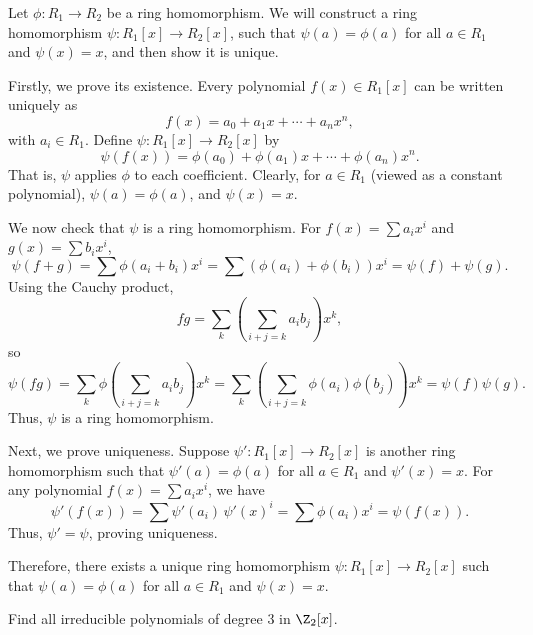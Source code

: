 \begin{solution}
  Let $\phi : R_1 \to R_2$ be a ring homomorphism. We will construct a ring homomorphism $\psi : R_1[x] \to R_2[x]$, such that $\psi(a) = \phi(a)$ for all $a \in R_1$ and $\psi(x) = x$, and then show it is unique.

  Firstly, we prove its existence. Every polynomial $f(x) \in R_1[x]$ can be written uniquely as
  \[%
    f(x) = a_0 + a_1 x + \cdots + a_n x^n
  ,\]%
  with $a_i \in R_1$. Define $\psi : R_1[x] \to R_2[x]$ by
  \[%
    \psi(f(x)) = \phi(a_0) + \phi(a_1)x + \cdots + \phi(a_n)x^n
  .\]%
  That is, $\psi$ applies $\phi$ to each coefficient. Clearly, for $a \in R_1$ (viewed as a constant polynomial), $\psi(a) = \phi(a)$, and $\psi(x) = x$.

  We now check that $\psi$ is a ring homomorphism. For $f(x) = \sum a_i x^i$ and $g(x) = \sum b_i x^i$,
  \[%
    \psi(f + g) = \sum \phi(a_i + b_i)x^i = \sum (\phi(a_i) + \phi(b_i))x^i = \psi(f) + \psi(g)
  .\]%
  Using the Cauchy product,
  \[%
    fg = \sum_{k} \left( \sum_{i+j=k} a_i b_j \right) x^k
  ,\]%
  so
  \[%
    \psi(fg) = \sum_{k} \phi\!\left(\sum_{i+j=k} a_i b_j\right)x^k = \sum_{k} \left(\sum_{i+j=k} \phi(a_i)\phi(b_j)\right)x^k = \psi(f)\psi(g)
  .\]%
  Thus, $\psi$ is a ring homomorphism.

  Next, we prove uniqueness. Suppose $\psi' : R_1[x] \to R_2[x]$ is another ring homomorphism such that $\psi'(a) = \phi(a)$ for all $a \in R_1$ and $\psi'(x) = x$. For any polynomial $f(x) = \sum a_i x^i$, we have
  \[%
    \psi'(f(x)) = \sum \psi'(a_i)\,\psi'(x)^i = \sum \phi(a_i)x^i = \psi(f(x))
  .\]%
  Thus, $\psi' = \psi$, proving uniqueness.

  Therefore, there exists a unique ring homomorphism $\psi : R_1[x] \to R_2[x]$ such that $\psi(a) = \phi(a)$ for all $a \in R_1$ and $\psi(x) = x$.
\end{solution}

\begin{problem}[28.38]
  Find all irreducible polynomials of degree 3 in $\Z_2[x]$.
\end{problem}


